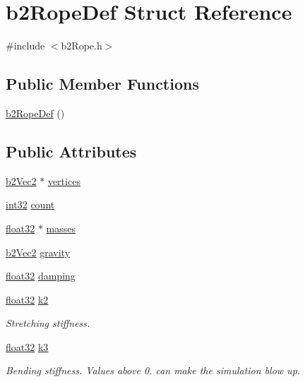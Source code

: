 \hypertarget{structb2_rope_def}{}\section{b2\+Rope\+Def Struct Reference}
\label{structb2_rope_def}


{\ttfamily \#include $<$b2\+Rope.\+h$>$}

\subsection*{Public Member Functions}
\begin{DoxyCompactItemize}
\item 
\mbox{\hyperlink{structb2_rope_def_a180ccb1c45c5e979e08ce6d0484638fd}{b2\+Rope\+Def}} ()
\end{DoxyCompactItemize}
\subsection*{Public Attributes}
\begin{DoxyCompactItemize}
\item 
\mbox{\hyperlink{structb2_vec2}{b2\+Vec2}} $\ast$ \mbox{\hyperlink{structb2_rope_def_ae18ad98b9796c505ae62ce58fa2f7051}{vertices}}
\item 
\mbox{\hyperlink{b2_settings_8h_a43d43196463bde49cb067f5c20ab8481}{int32}} \mbox{\hyperlink{structb2_rope_def_a0c75d4289a807e31f32dc43a2276671f}{count}}
\item 
\mbox{\hyperlink{b2_settings_8h_aacdc525d6f7bddb3ae95d5c311bd06a1}{float32}} $\ast$ \mbox{\hyperlink{structb2_rope_def_a78f75cce30ee253062ffa6f5462b36a1}{masses}}
\item 
\mbox{\hyperlink{structb2_vec2}{b2\+Vec2}} \mbox{\hyperlink{structb2_rope_def_a90d98969150047662ce835ec1670fb32}{gravity}}
\item 
\mbox{\hyperlink{b2_settings_8h_aacdc525d6f7bddb3ae95d5c311bd06a1}{float32}} \mbox{\hyperlink{structb2_rope_def_a13ad872bb9d4926f3e4e49b7061613cb}{damping}}
\item 
\mbox{\hyperlink{b2_settings_8h_aacdc525d6f7bddb3ae95d5c311bd06a1}{float32}} \mbox{\hyperlink{structb2_rope_def_a89de5d2c15afacd41722c76523e33826}{k2}}
\begin{DoxyCompactList}\small\item\em Stretching stiffness. \end{DoxyCompactList}\item 
\mbox{\hyperlink{b2_settings_8h_aacdc525d6f7bddb3ae95d5c311bd06a1}{float32}} \mbox{\hyperlink{structb2_rope_def_a3f4749e0a309b53daf804c75adfb4ba8}{k3}}
\begin{DoxyCompactList}\small\item\em Bending stiffness. Values above 0. can make the simulation blow up. \end{DoxyCompactList}\end{DoxyCompactItemize}


